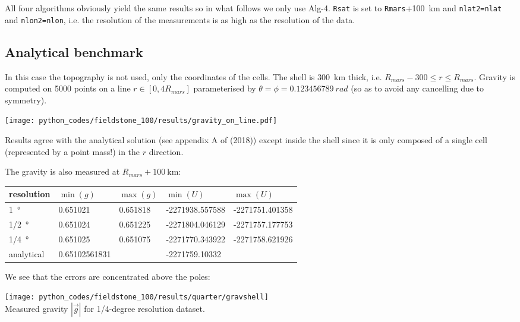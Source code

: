 All four algorithms obviously yield the same results so in what follows we 
only use Alg-4. \lstinline{Rsat} is set to \lstinline{Rmars}+100~km and \lstinline{nlat2=nlat}
and \lstinline{nlon2=nlon}, i.e. the resolution of the measurements is as high as the 
resolution of the data.

\newpage
\subsection*{Analytical benchmark}

In this case the topography is not used, only the coordinates of the cells. 
The shell is 300~\si{\km} thick, i.e. $R_{mars}-300 \le r \le R_{mars}$.
Gravity is computed on 5000 points on a line $r\in[0,4R_{mars}]$ parameterised by 
$\theta=\phi=0.123456789~\si{rad}$ (so as to avoid any cancelling due to symmetry).

\begin{center}
\texttt{[image: python\_codes/fieldstone\_100/results/gravity\_on\_line.pdf]}
\end{center}

Results agree with the analytical solution (see appendix A of \textcite{thie18} (2018))
except inside the shell since it is only composed of a 
single cell (represented by a point mass!) in the $r$ direction. 

The gravity is also measured at $R_{mars}+100~\si{\km}$:

\begin{center}
\begin{tabular}{lllll}
\hline
resolution        & $\min(g)$ & $\max(g)$ & $\min(U)$ & $\max(U)$ \\
\hline
\hline
1~\si{\degree}    & 0.651021 & 0.651818 & -2271938.557588 & -2271751.401358 \\
1/2~\si{\degree}  & 0.651024 & 0.651225 & -2271804.046129 & -2271757.177753 \\
1/4~\si{\degree}  & 0.651025 & 0.651075 & -2271770.343922 & -2271758.621926 \\
\hline
analytical & 0.65102561831 & & -2271759.10332  \\
\hline
\end{tabular}
\end{center}
We see that the errors are concentrated above the poles:


\begin{center}
\texttt{[image: python\_codes/fieldstone\_100/results/quarter/gravshell]}\\
{\captionfont Measured gravity $|\vec{g}|$ for 1/4-degree resolution dataset.}
\end{center}







